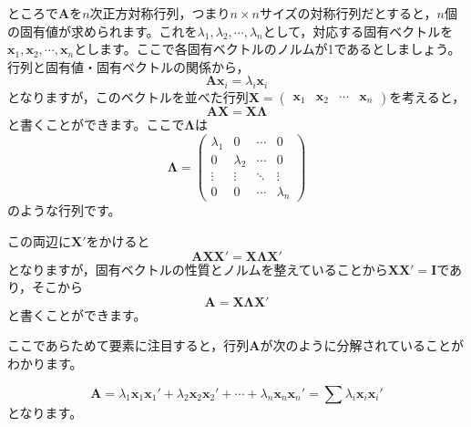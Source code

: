 \documentclass{ltjsbook}
\begin{document}
ところで$\bm{A}$を$n$次正方対称行列，つまり$n \times n$サイズの対称行列だとすると，$n$個の固有値が求められます。これを$\lambda_1,\lambda_2,\cdots,\lambda_n$として，対応する固有ベクトルを$\bm{x}_1,\bm{x}_2,\cdots,\bm{x}_n$とします。ここで各固有ベクトルのノルムが1であるとしましょう。行列と固有値・固有ベクトルの関係から，
\[ \bm{Ax}_i = \lambda_i\bm{x}_i\]
となりますが，このベクトルを並べた行列$\bm{X}=\begin{pmatrix}\bm{x}_1&\bm{x}_2& \cdots & \bm{x}_n\end{pmatrix}$を考えると，
\[ \bm{AX} = \bm{X \Lambda} \]
と書くことができます。ここで$\bm{\Lambda}$は
\[ \bm{\Lambda} =
	\begin{pmatrix} \lambda_1 & 0         & \cdots & 0         \\
                0         & \lambda_2 & \cdots & 0         \\
                \vdots    & \vdots    & \ddots & \vdots    \\
                0         & 0         & \cdots & \lambda_n\end{pmatrix}
\]
のような行列です。

この両辺に$\bm{X}'$をかけると
\[ \bm{AXX}' = \bm{X \Lambda X}' \]
となりますが，固有ベクトルの性質とノルムを整えていることから$\bm{XX}'=\bm{I}$であり，そこから
\[ \bm{A} = \bm{X \Lambda X}' \]
と書くことができます。

ここであらためて要素に注目すると，行列$\bm{A}$が次のように分解されていることがわかります。

\[
	\bm{A}= \lambda_1 \bm{x}_1 \bm{x}_1' + \lambda_2 \bm{x}_2 \bm{x}_2' + \cdots + \lambda_n \bm{x}_n \bm{x}_n'= \sum \lambda_{i} \bm{x}_{i} \bm{x}_i'
\]
となります。
\end{document}
